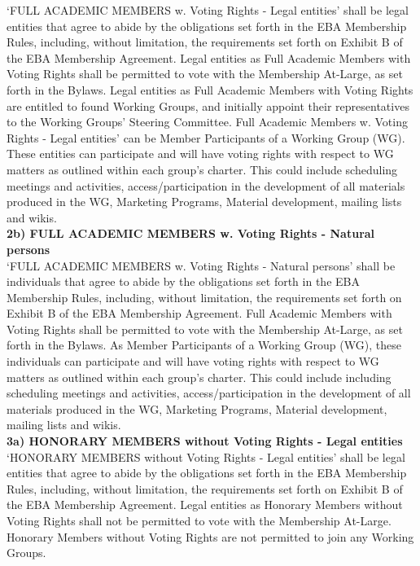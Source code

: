 \documentclass{article}
\begin{document}
‘FULL ACADEMIC MEMBERS w. Voting Rights - Legal entities’ shall be legal entities that agree to abide by the obligations set forth in the EBA Membership Rules, including, without limitation, the requirements set forth on Exhibit B of the EBA Membership Agreement. 
Legal entities as Full Academic Members with Voting Rights shall be permitted to vote with the Membership At-Large, as set forth in the Bylaws. Legal entities as Full Academic Members with Voting Rights are entitled to found Working Groups, and initially appoint their representatives to the Working Groups’ Steering Committee. 
Full Academic Members w. Voting Rights - Legal entities’ can be Member Participants of a Working Group (WG). These entities can participate and will have voting rights with respect to WG matters as outlined within each group's charter. 
This could include scheduling meetings and activities, access/participation in the development of all materials produced in the WG, Marketing Programs, Material development, mailing lists and wikis. \\

\textbf{2b) FULL ACADEMIC MEMBERS w. Voting Rights - Natural persons} \\

‘FULL ACADEMIC MEMBERS w. Voting Rights - Natural persons’ shall be individuals that agree to abide by the obligations set forth in the EBA Membership Rules, including, without limitation, the requirements set forth on Exhibit B of the EBA Membership Agreement. 
Full Academic Members with Voting Rights shall be permitted to vote with the Membership At-Large, as set forth in the Bylaws. 
As Member Participants of a Working Group (WG), these individuals can participate and will have voting rights with respect to WG matters as outlined within each group's charter. 
This could include including scheduling meetings and activities, access/participation in the development of all materials produced in the WG, Marketing Programs, Material development, mailing lists and wikis. \\

\textbf{3a) HONORARY MEMBERS without Voting Rights - Legal entities} \\

‘HONORARY MEMBERS without Voting Rights - Legal entities’ shall be legal entities that agree to abide by the obligations set forth in the EBA Membership Rules, including, without limitation, the requirements set forth on Exhibit B of the EBA Membership Agreement. 
Legal entities as Honorary Members without Voting Rights shall not be permitted to vote with the Membership At-Large. 
Honorary Members without Voting Rights are not permitted to join any Working Groups. \\
\end{document}
